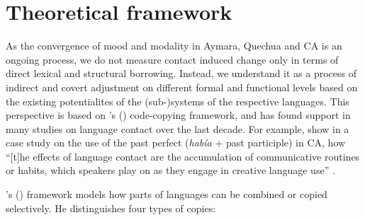 \documentclass[output=paper,hidelinks]{langscibook}
\begin{document}
\section{Theoretical framework}
\label{sec:theoreticalframework}
As the convergence of mood and modality in Aymara, Quechua and CA is an ongoing process, we do not measure contact induced change only in terms of direct lexical and structural borrowing. Instead, we understand it as a process of indirect and covert adjustment on different formal and functional levels based on the existing potentialites of the (sub-)systems of the respective languages. This perspective is based on \citeauthor{RN59}’s (\citeyear{RN59}) code-copying framework, and has found support in many studies on language contact over the last decade. For example, \citet{babel2014doing} show in a case study on the use of the past perfect (\textit{había} + past participle) in CA, how “[t]he effects of language contact are the accumulation of communicative routines or habits, which speakers play on as they engage in creative language use” \citep[254]{babel2014doing}. 

\citeauthor{RN59}’s (\citeyear{RN59}) framework models how parts of languages can be combined or copied selectively. He distinguishes four types of copies:
\end{document}
